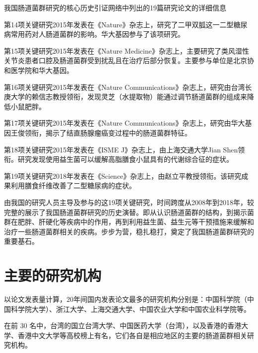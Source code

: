 \documentclass[]{ctexbook}
\begin{document}
\label{fig:china-histnet-articles}我国肠道菌群研究的核心历史引证网络中列出的19篇研究论文的详细信息

第14项关键研究2015年发表在《Nature》杂志上，研究了二甲双胍这一二型糖尿病常用药对人肠道菌群的影响。华大基因参与了该项研究。

第15项关键研究2015年发表在《Nature Medicine》杂志上，主要研究了类风湿性关节炎患者口腔及肠道菌群受到扰乱且在治疗后部分恢复。主要参与单位是北京协和医学院和华大基因。

第16项关键研究2015年发表在《Nature Communications》杂志上，研究由台湾长庚大学的赖信志教授领衔，发现灵芝（水提取物）能通过调节肠道菌群的组成来降低小鼠肥胖。

第17项关键研究2015年发表在《Nature Communications》杂志上，研究由华大基因王俊领衔，揭示了结直肠腺瘤癌变过程中的肠道菌群特征。

第18项关键研究2015年发表在《ISME J》杂志上，由上海交通大学Jian Shen领衔。研究发现使用益生菌可以缓解高脂膳食小鼠具有的代谢综合征的症状。

第19项关键研究2018年发表在《Science》杂志上，由赵立平教授领衔。该研究成果利用膳食纤维改善了二型糖尿病的症状。

由我国的研究人员主导及参与的这19项关键研究，时间跨度从2008年到2018年，较完整的展示了我国肠道菌群研究的历史演替。即从认识肠道菌群的结构，到揭示菌群在肥胖、肝硬化等疾病中的作用，再到利用益生菌、益生元等干预措施来缓解和治疗一些肠道菌群相关的疾病。步步为营，稳扎稳打，奠定了我国肠道菌群研究的重要基石。

\hypertarget{ux4e3bux8981ux7684ux7814ux7a76ux673aux6784}{%
\section{主要的研究机构}\label{ux4e3bux8981ux7684ux7814ux7a76ux673aux6784}}

以论文发表量计算，20年间国内发表论文最多的研究机构分别是：中国科学院（中国科学院大学）、浙江大学、上海交通大学、中国农业大学和中国农业科学院等。

在前 30 名中，台湾的国立台湾大学、中国医药大学（台湾），以及香港的香港大学、香港中文大学等高校榜上有名，它们各自是相应地区的主要的肠道菌群相关研究机构。
\end{document}
